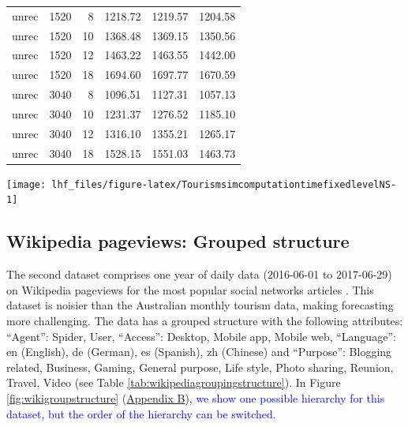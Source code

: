 \documentclass[11pt,a4paper,]{article}
\let\origfigure\figure
\let\endorigfigure\endfigure
\renewenvironment{figure}[1][2] {
    \expandafter\origfigure\expandafter[!htbp]
} {
    \endorigfigure
}
\let\origtable\table
\let\endorigtable\endtable
\renewenvironment{table}[1][2] {
    \expandafter\origtable\expandafter[!htbp]
} {
    \endorigtable
}
\begin{document}
\begin{table}[!h]
\begin{tabular}[t]{lrrrrl}
unrec & 1520 & 8 & 1218.72 & 1219.57 & 1204.58\\
unrec & 1520 & 10 & 1368.48 & 1369.15 & 1350.56\\
unrec & 1520 & 12 & 1463.22 & 1463.55 & 1442.00\\
unrec & 1520 & 18 & 1694.60 & 1697.77 & 1670.59\\
unrec & 3040 & 8 & 1096.51 & 1127.31 & 1057.13\\
unrec & 3040 & 10 & 1231.37 & 1276.52 & 1185.10\\
unrec & 3040 & 12 & 1316.10 & 1355.21 & 1265.17\\
unrec & 3040 & 18 & 1528.15 & 1551.03 & 1463.73\\
\bottomrule
\end{tabular}
\end{table}

\begin{figure}

{\centering \texttt{[image: lhf\_files/figure-latex/TourismsimcomputationtimefixedlevelNS-1]} 

}

\caption{Computation time (seconds) for ETS, ARIMA and OLS with and without reconciliation - Fixed origin forecasts with 8, 10, 12 and 18 levels of hierarchy with 304, 608, 1520 and 3040 number of bottom level series - two years forecast points with 0.5 error value - Simulated tourism dataset.}\label{fig:TourismsimcomputationtimefixedlevelNS}
\end{figure}

\clearpage
\FloatBarrier

\hypertarget{wikipedia-pageviews-grouped-structure}{%
\subsection{Wikipedia pageviews: Grouped structure}\label{wikipedia-pageviews-grouped-structure}}

The second dataset comprises one year of daily data (2016-06-01 to 2017-06-29) on Wikipedia pageviews for the most popular social networks articles \autocite{ashouri2018}. This dataset is noisier than the Australian monthly tourism data, making forecasting more challenging. The data has a grouped structure with the following attributes: ``Agent'': Spider, User, ``Access'': Desktop, Mobile app, Mobile web, ``Language'': en (English), de (German), es (Spanish), zh (Chinese) and ``Purpose'': Blogging related, Business, Gaming, General purpose, Life style, Photo sharing, Reunion, Travel, Video (see Table \ref{tab:wikipediagroupingstructure}). In Figure \ref{fig:wikigroupstructure} (\protect\hyperlink{appendixB}{Appendix B}), \textcolor{blue}{we show one possible hierarchy for this dataset, but the order of the hierarchy can be switched.}
\end{document}

